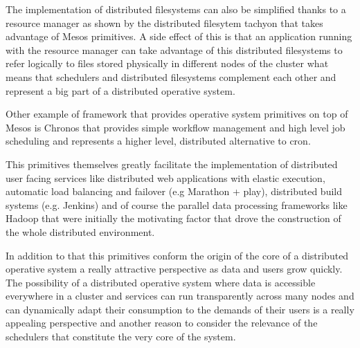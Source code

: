 \documentclass{report}                     %
\begin{document}
The implementation of distributed filesystems can also be simplified
thanks to a resource manager as shown by the distributed filesytem
tachyon \cite{li2013tachyon} that takes advantage of Mesos primitives. A side effect
of this is that an application running with the resource manager can
take advantage of this distributed filesystems to refer logically to
files stored physically in different nodes of the cluster what means
that schedulers and distributed filesystems complement each other and
represent a big part of a distributed operative system.

Other example of framework that provides operative system primitives
on top of Mesos is Chronos \cite{_chronos:_????} that provides simple
workflow management and high level job scheduling and represents a
higher level, distributed alternative to cron.

This primitives themselves greatly facilitate the implementation of
distributed user facing services like distributed web applications
with elastic execution, automatic load balancing and failover (e.g
Marathon + play), distributed build systems (e.g. Jenkins) and of
course the parallel data processing frameworks like Hadoop that were
initially the motivating factor that drove the construction of the
whole distributed environment.

In addition to that this primitives conform the origin of the core of
a distributed operative system a really attractive perspective as data
and users grow quickly. The possibility of a distributed operative
system where data is accessible everywhere in a cluster and services
can run transparently across many nodes and can dynamically adapt
their consumption to the demands of their users is a really
appealing perspective and another reason to consider the relevance of
the schedulers that constitute the very core of the system.



    
\end{document}
